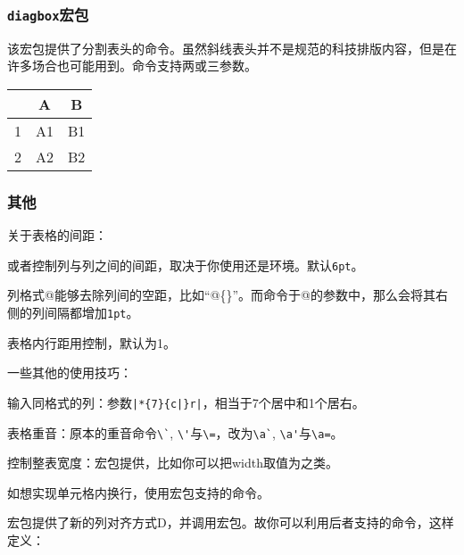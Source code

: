 \subsubsection{\texttt{diagbox}宏包}
该宏包提供了分割表头的命令。虽然斜线表头并不是规范的科技排版内容，但是在许多场合也可能用到。命令支持两或三参数。
\begin{codeshow}
\begin{tabular}{c|cc}
\diagbox{左边}{中间}{右边} & A & B \\
\hline
1 & A1 & B1 \\
2 & A2 & B2 
\end{tabular}
\end{codeshow}

\subsubsection{其他}
关于表格的间距：
\begin{feai}
\item {}或者控制列与列之间的间距，取决于你使用还是环境。默认\texttt{6pt}。
\item 列格式@能够去除列间的空距，比如“@\{\}”。而命令于@的参数中，那么会将其右侧的列间隔都增加\texttt{1pt}。
\item 表格内行距用控制，默认为1。
\end{feai}

一些其他的使用技巧：
\begin{feae}
\item 输入同格式的列：参数\verb+|*{7}{c|}r|+，相当于7个居中和1个居右。
\item 表格重音：原本的重音命令\verb|\`|, \verb|\'|与\verb|\=|，改为\verb|\a`|, \verb|\a'|与\verb|\a=|。
\item 控制整表宽度：宏包提供，比如你可以把width取值为之类。
\item 如想实现单元格内换行，使用宏包支持的命令。
\item 宏包提供了新的列对齐方式D，并调用宏包。故你可以利用后者支持的命令，这样定义：
\begin{latex}
\end{latex}
\end{feae}

